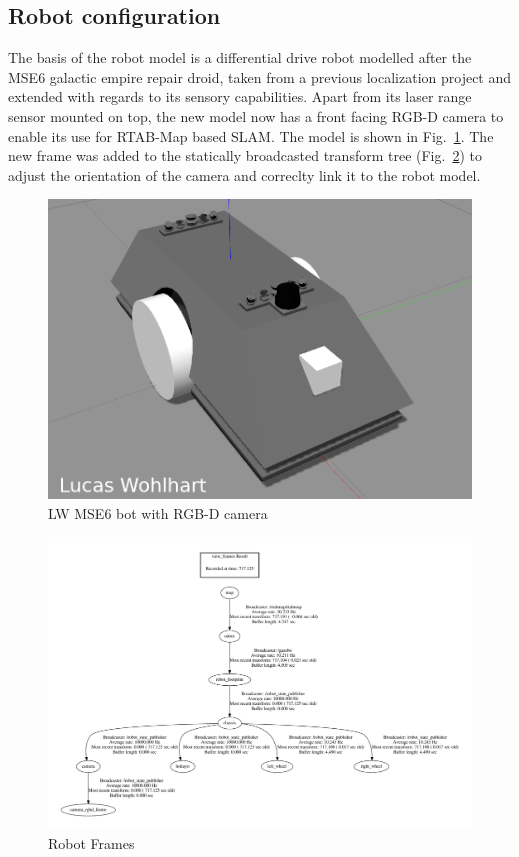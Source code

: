 \documentclass[10pt,journal,compsoc]{IEEEtran}
\begin{document}
\subsection{Robot configuration}
The basis of the robot model is a differential drive robot modelled after the MSE6 galactic empire repair droid, taken from a previous localization project and extended with regards to its sensory capabilities. Apart from its laser range sensor mounted on top, the new model now has a front facing RGB-D camera to enable its use for RTAB-Map based SLAM. The model is shown in Fig.~\ref{fig:lw_mse6_bot_slam}.
The new frame was added to the statically broadcasted transform tree (Fig.~\ref{fig:frames}) to adjust the orientation of the camera and correclty link it to the robot model.

\begin{figure}[thpb]
      \centering
      \includegraphics[width=\linewidth]{img/lw_mse6_bot_slam.png}
      \caption{LW MSE6 bot with RGB-D camera}
      \label{fig:lw_mse6_bot_slam}
\end{figure}
\begin{figure}[thpb]
      \centering
      \includegraphics[width=\linewidth]{img/frames}
      \caption{Robot Frames}
      \label{fig:frames}
\end{figure}
\end{document}
